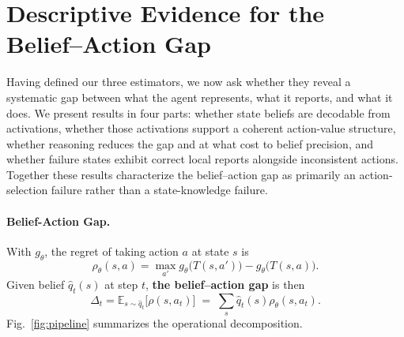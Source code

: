 \documentclass[10pt,twocolumn]{article}
\begin{document}
\section{Descriptive Evidence for the \\ Belief--Action Gap}

Having defined our three estimators, we now ask whether they reveal a systematic gap between what the agent represents, what it reports, and what it does. We present results in four parts: whether state beliefs are decodable from activations, whether those activations support a coherent action-value structure, whether reasoning reduces the gap and at what cost to belief precision, and whether failure states exhibit correct local reports alongside inconsistent actions. Together these results characterize the belief--action gap as primarily an action-selection failure rather than a state-knowledge failure.

\paragraph{Belief-Action Gap.} With $g_\theta$, the regret of taking action $a$ at state $s$ is
\[
    \rho_\theta(s, a) = \max_{a'} g_\theta\bigl(T(s, a')\bigr) - g_\theta\bigl(T(s, a)\bigr).
\]
Given belief $\hat{q}_t(s)$ at step $t$, \textbf{the belief--action gap}  is then
\[
\Delta_t = \mathbb{E}_{s \sim \hat{q}_t}\bigl[\rho(s, a_t)\bigr]
    \;=\;
    \sum_{s} \hat{q}_t(s)\rho_\theta(s, a_t).
\]%
Fig.~\ref{fig:pipeline} summarizes the operational decomposition.
\end{document}
